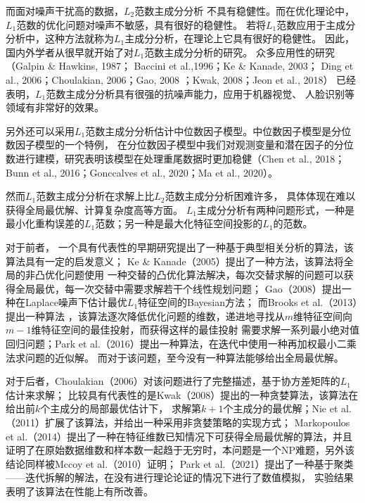 而面对噪声干扰高的数据，$L_2$范数主成分分析
不具有稳健性。而在优化理论中，$L_1$范数的优化问题对噪声不敏感，具有很好的稳健性。
若将$L_1$范数应用于主成分分析中，这种方法就称为$L_1$主成分分析，在理论上它具有很好的稳健性。
因此，国内外学者从很早就开始了对$L_1$范数主成分分析的研究。
众多应用性的研究（Galpin \& Hawkins, 1987\cite{galpin1987methods}；
Baccini et al.,1996\cite{baccini1996l1}；Ke \& Kanade, 2003\cite{ke2003robust}；
Ding et al., 2006\cite{ding2006r}；Choulakian, 2006\cite{choulakian2006l1}；Gao, 2008\cite{gao2008robust}
；Kwak, 2008\cite{kwak2008principal}；Jeon et al., 2018\cite{jeon2018data}）
已经表明，$L_1$范数主成分分析具有很强的抗噪声能力，应用于机器视觉\cite{ke2005robust}、
人脸识别\cite{kwak2008principal}等领域有非常好的效果。

另外还可以采用$L_1$范数主成分分析估计中位数因子模型。中位数因子模型是分位数因子模型的一个特例，
在分位数因子模型中我们对观测变量和潜在因子的分位数进行建模，研究表明该模型在处理重尾数据时更加稳健（Chen et al., 2018\cite{chen2018quantile}；
Bunn et al., 2016\cite{bunn2016analysis}；Gonccalves et al., 2020\cite{gonccalves2020bayesian}；Ma et al., 2020\cite{ma2020estimation}）。

然而$L_1$范数主成分分析在求解上比$L_2$范数主成分分析困难许多，
具体体现在难以获得全局最优解、计算复杂度高等方面。
$L_1$主成分分析有两种问题形式，一种是最小化重构误差的$L_1$范数；另一种是最大化特征空间投影的$L_1$的范数。

对于前者，
一个具有代表性的早期研究\cite{baccini1996l1}提出了一种基于典型相关分析的算法，该算法具有一定的启发意义；
Ke \& Kanade（2005）提出了一种方法\cite{ke2005robust}，该算法将全局的非凸优化问题使用
一种交替的凸优化算法解决，每次交替求解的问题可以获得全局最优，每一次交替中需要求解若干个线性规划问题；
Gao（2008）提出一种在Laplace噪声下估计最优$L_1$特征空间的Bayesian方法\cite{gao2008robust}；
而Brooks et al.（2013）提出一种算法
\cite{brooks2013pure}，该算法逐次降低优化问题的维数，递进地寻找从$m$维特征空间向$m-1$维特征空间的最佳投射，而获得这样的最佳投射
需要求解一系列最小绝对值回归问题；Park et al.（2016）提出一种算法\cite{park2016iteratively}，在迭代中使用一种再加权最小二乘法求问题的近似解。
而对于该问题，至今没有一种算法能够给出全局最优解。

对于后者，Choulakian（2006）对该问题进行了完整描述\cite{choulakian2006l1}，基于协方差矩阵的$L_1$估计\cite{galpin1987methods}来求解；
比较具有代表性的是Kwak（2008）提出的一种贪婪算法\cite{kwak2008principal}，该算法在给出前$k$个主成分的局部最优估计下，
求解第$k+1$个主成分的最优解；Nie et al.（2011）扩展了该算法，并给出一种采用非贪婪策略的实现方式\cite{nie2011robust}；
Markopoulos et al.（2014）提出了一种在特征维数已知情况下可获得全局最优解的算法\cite{markopoulos2014optimal}，并且
证明了在原始数据维数和样本数一起趋于无穷时，本问题是一个NP难题，另外该结论同样被Mccoy et al.（2010）证明\cite{mccoy2010two}；
Park et al.（2021）提出了一种基于聚类——迭代拆解的解法\cite{park2021optimization}，在没有进行理论论证的情况下进行了数值模拟，
实验结果表明了该算法在性能上有所改善。


